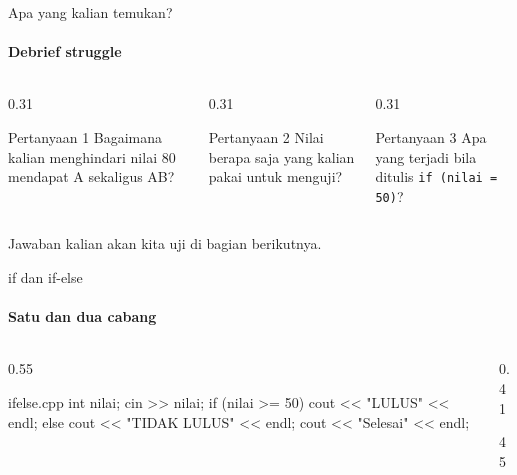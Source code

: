 \documentclass[t]{beamer}
\begin{document}
\begin{frame}{Apa yang kalian temukan?}
\framesubtitle{Debrief struggle}
\begin{columns}[T]
\begin{column}{0.31\textwidth}
\begin{BlokGelap}{Pertanyaan 1}
Bagaimana kalian menghindari nilai 80 mendapat A sekaligus AB?
\end{BlokGelap}
\end{column}
\begin{column}{0.31\textwidth}
\begin{BlokGelap}{Pertanyaan 2}
Nilai berapa saja yang kalian pakai untuk menguji?
\end{BlokGelap}
\end{column}
\begin{column}{0.31\textwidth}
\begin{BlokGelap}{Pertanyaan 3}
Apa yang terjadi bila ditulis \texttt{if (nilai = 50)}?
\end{BlokGelap}
\end{column}
\end{columns}
\vspace{10pt}
Jawaban kalian akan kita uji di bagian berikutnya.
\end{frame}


\begin{frame}[fragile]{if dan if-else}
\framesubtitle{Satu dan dua cabang}
\begin{columns}[T]
\begin{column}{0.55\textwidth}
\begin{Kode}[]{ifelse.cpp}
int nilai;
cin >> nilai;
if (nilai >= 50) {
    cout << "LULUS" << endl;
} else {
    cout << "TIDAK LULUS" << endl;
}
cout << "Selesai" << endl;
\end{Kode}
\end{column}
\begin{column}{0.41\textwidth}
\begin{Keluaran}[title={Masukan}]
45
\end{Keluaran}
\end{column}
\end{columns}
\end{frame}
\end{document}
